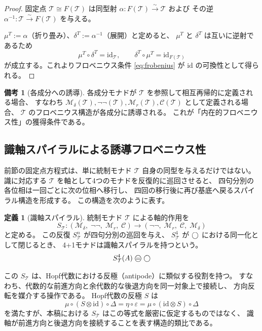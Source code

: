 \documentclass[11pt,a4paper]{article}
\newcommand{\Mr}{\mathcal{M}_r}
\newcommand{\Md}{\mathcal{M}_\delta}
\newcommand{\Mnn}{\neg\neg}
\newcommand{\MC}{\mathcal{C}}
\newcommand{\MT}{\mathcal{T}}
\theoremstyle{definition}
\newtheorem{definition}{定義}[section]
\newtheorem{remark}{備考}[section]
\begin{document}
\begin{proof}
固定点 $\MT \cong F(\MT)$ は同型射
$\alpha: F(\MT) \xrightarrow{\sim} \MT$ および
その逆 $\alpha^{-1}: \MT \xrightarrow{\sim} F(\MT)$ を与える。

$\mu^T := \alpha$（折り畳み）、$\delta^T := \alpha^{-1}$（展開）と定めると、
$\mu^T$ と $\delta^T$ は互いに逆射であるため
\begin{equation}
  \mu^T \circ \delta^T = \mathrm{id}_{\MT},\qquad
  \delta^T \circ \mu^T = \mathrm{id}_{F(\MT)}
\end{equation}
が成立する。これよりフロベニウス条件 \eqref{eq:frobenius} が
$\mathrm{id}$ の可換性として得られる。
\end{proof}

\begin{remark}[各成分への誘導]
各成分モナドが $\MT$ を参照して相互再帰的に定義される場合、
すなわち $\Md(\MT), \Mnn(\MT), \Mr(\MT), \MC(\MT)$ として定義される場合、
$\MT$ のフロベニウス構造が各成分に誘導される。
これが「内在的フロベニウス性」の獲得条件である。
\end{remark}


\subsection{識軸スパイラルによる誘導フロベニウス性}

前節の固定点方程式は、単に統制モナド $\MT$ 自身の同型を与えるだけではない。
識に対応する $\MT$ を軸として4つのモナドを反復的に巡回させると、
四句分別の各位相は一回ごとに次の位相へ移行し、
四回の移行後に再び基底へ戻るスパイラル構造を形成する。
この構造を次のように表す。

\begin{definition}[識軸スパイラル]
統制モナド $\MT$ による軸的作用を
\begin{equation}
  S_{\MT}: (\Md,\;\Mnn,\;\Mr,\;\MC) \longrightarrow
  (\Mnn,\;\Mr,\;\MC,\;\Md)
\end{equation}
と定める。
この反復 $S_{\MT}^n$ が四句分別の巡回を与え、
$S_{\MT}^4$ が $\bigcirc$ における同一化として閉じるとき、
4+1モナドは識軸スパイラルを持つという。
\begin{equation}
  S_{\MT}^4(A) \mweq \dfix
\end{equation}
\end{definition}

この $S_{\MT}$ は、Hopf代数における反極（antipode）に類似する役割を持つ。
すなわち、代数的な前進方向と余代数的な後退方向を同一対象上で接続し、
方向反転を媒介する操作である。
Hopf代数の反極 $S$ は\cite{Sweedler1969}
\begin{equation}
  \mu \circ (S \otimes \mathrm{id}) \circ \Delta
  = \eta \circ \varepsilon
  = \mu \circ (\mathrm{id} \otimes S) \circ \Delta
\end{equation}
を満たすが、本稿における $S_{\MT}$ はこの等式を厳密に仮定するものではなく、
識軸が前進方向と後退方向を接続することを表す構造的類比である。
\end{document}

